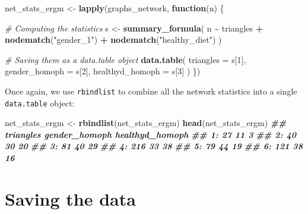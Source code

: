 \documentclass[
]{book}
\newenvironment{Shaded}{\begin{snugshade}}{\end{snugshade}}
\newcommand{\AttributeTok}[1]{\textcolor[rgb]{0.13,0.29,0.53}{#1}}
\newcommand{\CommentTok}[1]{\textcolor[rgb]{0.56,0.35,0.01}{\textit{#1}}}
\newcommand{\ControlFlowTok}[1]{\textcolor[rgb]{0.13,0.29,0.53}{\textbf{#1}}}
\newcommand{\DecValTok}[1]{\textcolor[rgb]{0.00,0.00,0.81}{#1}}
\newcommand{\DocumentationTok}[1]{\textcolor[rgb]{0.56,0.35,0.01}{\textbf{\textit{#1}}}}
\newcommand{\FunctionTok}[1]{\textcolor[rgb]{0.13,0.29,0.53}{\textbf{#1}}}
\newcommand{\NormalTok}[1]{#1}
\newcommand{\OtherTok}[1]{\textcolor[rgb]{0.56,0.35,0.01}{#1}}
\newcommand{\SpecialCharTok}[1]{\textcolor[rgb]{0.81,0.36,0.00}{\textbf{#1}}}
\newcommand{\StringTok}[1]{\textcolor[rgb]{0.31,0.60,0.02}{#1}}
\begin{document}
\begin{Shaded}
\begin{Highlighting}[]
\NormalTok{net\_stats\_ergm }\OtherTok{\textless{}{-}} \FunctionTok{lapply}\NormalTok{(graphs\_network, }\ControlFlowTok{function}\NormalTok{(n) \{}
  
  \CommentTok{\# Computing the statistics}
\NormalTok{  s }\OtherTok{\textless{}{-}} \FunctionTok{summary\_formula}\NormalTok{(}
\NormalTok{    n }\SpecialCharTok{\textasciitilde{}}\NormalTok{ triangles }\SpecialCharTok{+}
      \FunctionTok{nodematch}\NormalTok{(}\StringTok{"gender\_1"}\NormalTok{) }\SpecialCharTok{+}
      \FunctionTok{nodematch}\NormalTok{(}\StringTok{"healthy\_diet"}\NormalTok{)}
\NormalTok{    )}
  
  \CommentTok{\# Saving them as a data.table object}
  \FunctionTok{data.table}\NormalTok{(}
    \AttributeTok{triangles       =}\NormalTok{ s[}\DecValTok{1}\NormalTok{],}
    \AttributeTok{gender\_homoph   =}\NormalTok{ s[}\DecValTok{2}\NormalTok{],}
    \AttributeTok{healthyd\_homoph =}\NormalTok{ s[}\DecValTok{3}\NormalTok{]}
\NormalTok{  )}
\NormalTok{\})}
\end{Highlighting}
\end{Shaded}

Once again, we use \texttt{rbindlist} to combine all the network statistics into a single \texttt{data.table} object:

\begin{Shaded}
\begin{Highlighting}[]
\NormalTok{net\_stats\_ergm }\OtherTok{\textless{}{-}} \FunctionTok{rbindlist}\NormalTok{(net\_stats\_ergm)}
\FunctionTok{head}\NormalTok{(net\_stats\_ergm)}
\DocumentationTok{\#\#    triangles gender\_homoph healthyd\_homoph}
\DocumentationTok{\#\# 1:        27            11               3}
\DocumentationTok{\#\# 2:        40            30              20}
\DocumentationTok{\#\# 3:        81            40              29}
\DocumentationTok{\#\# 4:       216            33              38}
\DocumentationTok{\#\# 5:        79            44              19}
\DocumentationTok{\#\# 6:       121            38              16}
\end{Highlighting}
\end{Shaded}

\hypertarget{saving-the-data}{%
\section{Saving the data}\label{saving-the-data}}
\end{document}
